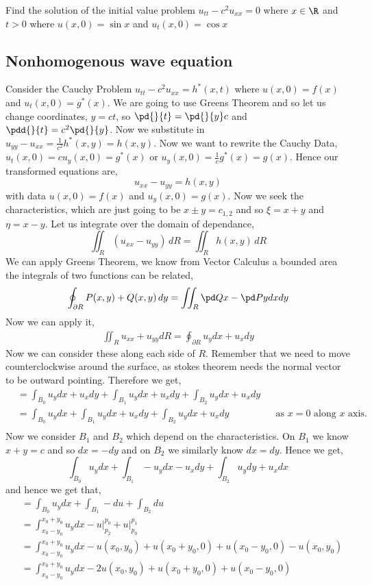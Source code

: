 \begin{eg}
  Find the solution of the initial value problem $u_{tt} - c^2u_{xx} = 0$ where $x \in \R$ and $t > 0$ where $u(x, 0) = \sin x$ and $u_{t}(x, 0) = \cos x$
\end{eg}

\subsection{Nonhomogenous wave equation}
Consider the Cauchy Problem $u_{tt} - c^2u_{xx} = h^*(x, t)$ where $u(x, 0)= f(x)$ and $u_t(x, 0) = g^*(x)$. We are going to use Greens Theorem and so let us change coordinates, $y = ct$, so $\pd{}{t} = \pd{}{y}c$ and $\pdd{}{t} = c^2\pd{}{y}$. Now we substitute in $u_{yy} - u_{xx} = \frac{1}{c^2}h^*(x, y) = h(x, y)$. Now we want to rewrite the Cauchy Data, $u_{t} (x, 0) = cu_y(x, 0) = g^*(x)$ or $u_y(x, 0) = \frac{1}{c}g^*(x) = g(x)$. Hence our transformed equations are,
$$ u_{xx} - u_{yy} = h(x, y) $$
with data $u(x, 0) = f(x)$ and $u_y(x, 0) = g(x)$. Now we seek the characteristics, which are just going to be $x \pm y = c_{1, 2}$ and so $\xi = x + y$ and $\eta = x - y$.
Let us integrate over the domain of dependance,
$$ \iint_R (u_{xx} - u_{yy})\, dR = \iint_R h(x, y)\,dR $$
We can apply Greens Theorem, we know from Vector Calculus a bounded area the integrals of two functions can be related,
$$ \oint_{\partial R} P(x, y) + Q(x, y)\, dy = \iint_{R} \pd Q x - \pd P y dxdy $$
Now we can apply it,
\begin{align*}
  \iint_{R} u_{xx} + u_{yy} dR = \oint_{\partial R} u_ydx + u_xdy
\end{align*}
Now we can consider these along each side of $R$. Remember that we need to move counterclockwise around the surface, as stokes theorem needs the normal vector to be outward pointing. Therefore we get,
\begin{align*}
  &= \int_{B_0} u_ydx + u_xdy + \int_{B_1} u_ydx + u_xdy + \int_{B_2} u_ydx + u_xdy \\
  &= \int_{B_0} u_ydx + \int_{B_1} u_ydx + u_xdy + \int_{B_2} u_ydx + u_xdy && \text{as $x = 0$ along $x$ axis.} \\
\end{align*}
Now we consider $B_1$ and $B_2$ which depend on the characteristics. On $B_1$ we know $x + y = c$ and so $dx = -dy$ and on $B_2$ we similarly know $dx = dy$. Hence we get,
$$ \int_{B_0} u_ydx + \int_{B_1} -u_ydx - u_xdy + \int_{B_2} u_ydy + u_xdx $$
and hence we get that,
\begin{align*}
  &= \int_{B_0} u_ydx + \int_{B_1} -du + \int_{B_2} du \\
  &=\int_{x_0 - y_0}^{x_0 + y_0} u_ydx - \left.u\right|_{p_2}^{p_0} + \left. u\right|_{p_0}^{p_1} \\
  &= \int_{x_0 - y_0}^{x_0 + y_0} u_ydx - u(x_0, y_0) + u(x_0 + y_0, 0) + u(x_0 - y_0, 0) - u(x_0, y_0) \\
  &= \int_{x_0 - y_0}^{x_0 + y_0} u_ydx - 2u(x_0, y_0) + u(x_0 + y_0, 0) + u(x_0 - y_0, 0) \\
\end{align*}
